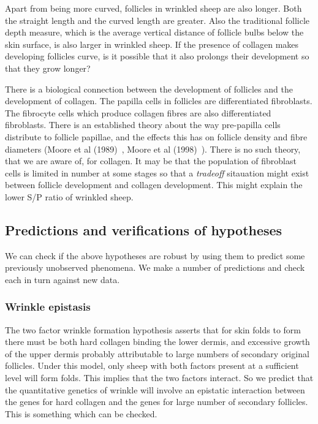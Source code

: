 \documentclass[titlepage]{article}  %
\begin{document}
Apart from being more curved, follicles in wrinkled sheep are also longer. Both the straight length and the curved length are greater. Also the traditional follicle depth measure, which is the average vertical distance of follicle bulbs below the skin surface, is also larger in wrinkled sheep.  If the presence of collagen makes developing follicles curve, is it possible that it also prolongs their development so that they grow longer? 

There is a biological connection between the development of follicles and the development of collagen. The papilla cells in follicles are differentiated fibroblasts. The fibrocyte cells which produce collagen fibres are also differentiated fibroblasts.  There is an established theory about the way pre-papilla cells distribute to follicle papillae, and the effects this has on follicle density and fibre diameters (Moore et al (1989)~\cite{moor:89}, Moore et al (1998)~\cite{moor:98}). There is no such theory, that we are aware of, for collagen. It may be that the population of fibroblast cells is limited in number at some stages so that a {\em tradeoff} sitauation might exist between follicle development and collagen development. This might explain the lower S/P ratio of wrinkled sheep.

\subsection{Predictions and verifications of hypotheses}
We can check if the above hypotheses are robust by using them to predict some previously unobserved phenomena. We make a number of predictions and check each in turn against new data.

\subsubsection{Wrinkle epistasis}
The two factor wrinkle formation hypothesis asserts that for skin folds to form there must be both hard collagen binding the lower dermis, and excessive growth of the upper dermis probably attributable to large numbers of secondary original follicles. Under this model, only sheep with both factors present at a sufficient level will form folds. This implies that the two factors interact. So we predict that the quantitative genetics of wrinkle will involve an epistatic interaction between the genes for hard collagen and the genes for large number of secondary follicles. This is something which can be checked.
\end{document}
